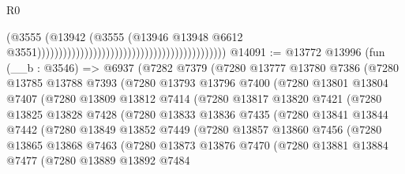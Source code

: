 \begin{lexlean}{R0}
\begin{coremodule}
                                                                                    (@3555
                                                                                      (@13942
                                                                                        (@3555
                                                                                          (@13946
                                                                                            @13948
                                                                                            @6612
                                                                                            @3551))))))))))))))))))))))))))))))))))))))))))))
@14091 := @13772
    @13996
    (fun (__b : @3546) =>
    @6937
      (@7282
        @7379
        (@7280
          @13777
          @13780
          @7386
          (@7280
            @13785
            @13788
            @7393
            (@7280
              @13793
              @13796
              @7400
              (@7280
                @13801
                @13804
                @7407
                (@7280
                  @13809
                  @13812
                  @7414
                  (@7280
                    @13817
                    @13820
                    @7421
                    (@7280
                      @13825
                      @13828
                      @7428
                      (@7280
                        @13833
                        @13836
                        @7435
                        (@7280
                          @13841
                          @13844
                          @7442
                          (@7280
                            @13849
                            @13852
                            @7449
                            (@7280
                              @13857
                              @13860
                              @7456
                              (@7280
                                @13865
                                @13868
                                @7463
                                (@7280
                                  @13873
                                  @13876
                                  @7470
                                  (@7280
                                    @13881
                                    @13884
                                    @7477
                                    (@7280
                                      @13889
                                      @13892
                                      @7484

\end{coremodule}
\end{lexlean}
